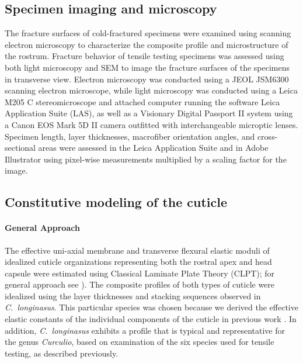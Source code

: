 \documentclass[twocolumn, linenumbers, superscriptaddress, nofootinbib]{revtex4-1}
\begin{document}
		\subsection*{Specimen imaging and microscopy}
			The fracture surfaces of cold-fractured specimens were examined using scanning electron microscopy to characterize the composite profile and microstructure of the rostrum.
			Fracture behavior of tensile testing specimens was assessed using both light microscopy and SEM to image the fracture surfaces of the specimens in transverse view.
			Electron microscopy was conducted using a JEOL JSM6300 scanning electron microscope, while light microscopy was conducted using a Leica M205 C stereomicroscope and attached	computer running the software Leica Application Suite (LAS), as well as a Visionary Digital Passport II system using a Canon EOS Mark 5D II camera outfitted with interchangeable microptic lenses.
			Specimen length, layer thicknesses, macrofiber orientation angles, and cross-sectional areas were assessed in the Leica Application Suite and in Adobe Illustrator using pixel-wise measurements multiplied by a scaling factor for the image.
			
		\subsection*{Constitutive modeling of the cuticle}
			\paragraph*{General Approach}
				The effective uni-axial membrane and transverse flexural elastic moduli of idealized cuticle organizations representing both the rostral apex and head capsule were estimated using Classical Laminate Plate Theory (CLPT); for general approach see \cite{Jones2014, Reddy2004}).
				The composite profiles of both types of cuticle were idealized using the layer thicknesses and stacking sequences observed in \textit{C.~longinasus}.
				This particular species was chosen because we derived the effective elastic constants of the individual components of the cuticle in previous work \cite{Jansen2016, Singh2016}.
				In addition, \textit{C.~longinasus} exhibits a profile that is typical and representative for the genus \textit{Curculio}, based on examination of the six species used for tensile testing, as described previously.
				
\end{document}
